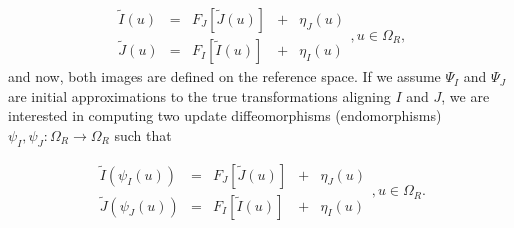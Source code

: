 \begin{equation}\label{eq:SyNEM_gom_warped}
    \begin{array}{ccccc}
        \tilde{I}(u) &=& F_{J}[\tilde{J}(u)] &+& \eta_{J}(u)\\
        \tilde{J}(u) &=& F_{I}[\tilde{I}(u)] &+& \eta_{I}(u)
    \end{array}, u\in\Omega_{R},
\end{equation}
and now, both images are defined on the reference space. If we assume $\Psi_{I}$ and $\Psi_{J}$ are initial approximations to the true transformations
aligning $I$ and $J$, we are interested in computing two update diffeomorphisms (endomorphisms) \hbox{$\psi_{I}, \psi_{J} : \Omega_{R} \rightarrow \Omega_{R}$} such that

\begin{equation}\label{eq:SyNEM_gom_update}
    \begin{array}{ccccc}
    	\tilde{I}(\psi_{I}(u)) &=& F_{J}[\tilde{J}(u)] &+& \eta_{J}(u)\\
        \tilde{J}(\psi_{J}(u)) &=& F_{I}[\tilde{I}(u)] &+& \eta_{I}(u)
    \end{array}, u\in\Omega_{R}.
\end{equation}

